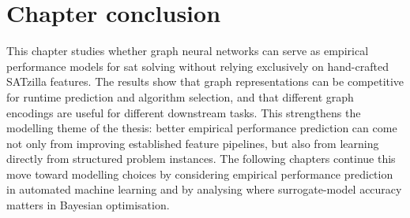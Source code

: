 \section{Chapter conclusion}

This chapter studies whether graph neural networks can serve as empirical performance models for \gls{sat} solving without relying exclusively on hand-crafted SATzilla features.
The results show that graph representations can be competitive for runtime prediction and algorithm selection, and that different graph encodings are useful for different downstream tasks.
This strengthens the modelling theme of the thesis: better empirical performance prediction can come not only from improving established feature pipelines, but also from learning directly from structured problem instances.
The following chapters continue this move toward modelling choices by considering empirical performance prediction in automated machine learning and by analysing where surrogate-model accuracy matters in Bayesian optimisation.
